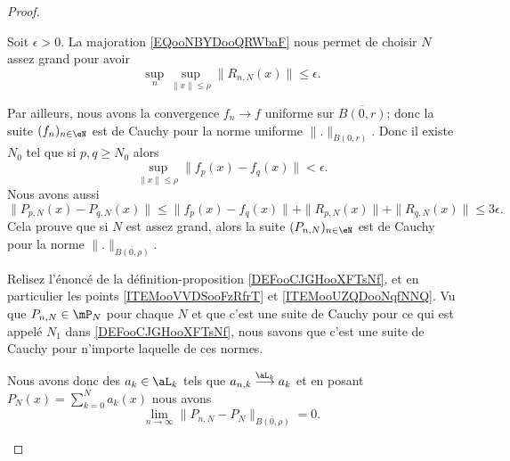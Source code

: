 \begin{proof}
\begin{subproof}
		Soit \( \epsilon>0\). La majoration \eqref{EQooNBYDooQRWbaF} nous permet de choisir \( N\) assez grand pour avoir
		\begin{equation}
			\sup_n\sup_{\| x \|\leq \rho}\| R_{n,N}(x) \|\leq \epsilon.
		\end{equation}

		Par ailleurs, nous avons la convergence \( f_n\to f\) uniforme sur \( \overline{B(0,r)}\); donc la suite \( (f_n)_{n\in \eN}\) est de Cauchy pour la norme uniforme \( \| . \|_{\overline{B(0,r)}}\). Donc il existe \( N_0\) tel que si \( p,q\geq N_0\) alors
		\begin{equation}
			\sup_{\| x \|\leq \rho}\| f_p(x)-f_q(x) \|< \epsilon.
		\end{equation}
		Nous avons aussi
		\begin{equation}
			\| P_{p,N}(x)-P_{q,N}(x) \|\leq \| f_p(x)-f_q(x) \|+\| R_{p,N}(x) \|+\| R_{q,N}(x) \|\leq 3\epsilon.
		\end{equation}
		Cela prouve que si \( N\) est assez grand, alors la suite \( (P_{n,N})_{n\in \eN}\) est de Cauchy pour la norme \( \| . \|_{\overline{B(0,\rho)}}\).

		Relisez l'énoncé de la définition-proposition \ref{DEFooCJGHooXFTsNf}, et en particulier les points \ref{ITEMooVVDSooFzRfrT} et \ref{ITEMooUZQDooNqfNNQ}. Vu que \( P_{n,N}\in\mP_N\) pour chaque \( N\) et que c'est une suite de Cauchy pour ce qui est appelé \( N_1\) dans \ref{DEFooCJGHooXFTsNf}, nous savons que c'est une suite de Cauchy pour n'importe laquelle de ces normes.

		Nous avons donc des \( a_k\in\aL_k\) tels que \( a_{n,k}\stackrel{ \aL_k}{\longrightarrow}  a_k\) et en posant \( P_N(x)=\sum_{k=0}^Na_k(x)\) nous avons
		\begin{equation}
			\lim_{n\to \infty}\| P_{n,N}-P_N \|_{\overline{B(0,\rho)}}=0.
		\end{equation}


\end{subproof}
\end{proof}
